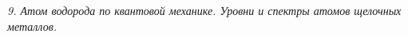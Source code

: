 \emph{9. Атом водорода по квантовой механике. Уровни и спектры атомов 
щелочных металлов.}

\newpage
